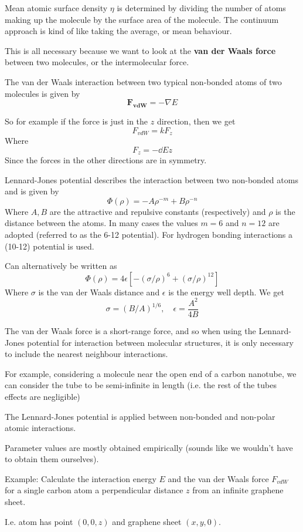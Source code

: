 \documentclass{X:/Documents/Coding/Latex/myassignment}
\begin{document}
Mean atomic surface density $\eta$ is determined by dividing the number of atoms making up the molecule by the surface area of the molecule. 
The continuum approach is kind of like taking the average, or mean behaviour.

This is all necessary because we want to look at the \textbf{van der Waals force} between two molecules, or the intermolecular force. 

The van der Waals interaction between two typical non-bonded atoms of two molecules is given by
\[\mathbf{F_{vdW}} = -\nabla E\]

So for example if the force is just in the $z$ direction, then we get
\[F_{vdW} = kF_z\]
Where
\[F_z = - \dd Ez\]
Since the forces in the other directions are in symmetry.

Lennard-Jones potential describes the interaction between two non-bonded atoms and is given by
\[\Phi(\rho) = -A\rho^{-m} + B\rho^{-n}\]
Where $A,B$ are the attractive and repulsive constants (respectively) and $\rho$ is the distance between the atoms. In many cases the values $m = 6$ and $n=12$ are adopted (referred to as the 6-12 potential). For hydrogen bonding interactions a (10-12) potential is used.

Can alternatively be written as
\[\Phi(\rho) = 4 \epsilon \left[ - \left(\sigma/\rho\right)^{6} + \left(\sigma/\rho\right)^{12}\right]\]
Where $\sigma$ is the van der Waals distance and $\epsilon$ is the energy well depth. We get
\[\sigma = \left(B/A\right)^{1/6},\quad \epsilon = \frac{A^2}{4B}\]

The van der Waals force is a short-range force, and so when using the Lennard-Jones potential for interaction between molecular structures, it is only necessary to include the nearest neighbour interactions.

For example, considering a molecule near the open end of a carbon nanotube, we can consider the tube to be semi-infinite in length (i.e. the rest of the tubes effects are negligible)


The Lennard-Jones potential is applied between non-bonded and non-polar atomic interactions.

Parameter values are mostly obtained empirically (sounds like we wouldn't have to obtain them ourselves). 

Example: Calculate the interaction energy $E$ and the van der Waals force $F_{vdW}$ for a single carbon atom a perpendicular distance $z$ from an infinite graphene sheet.

I.e. atom has point $(0,0,z)$ and graphene sheet $(x,y,0)$.
\end{document}
